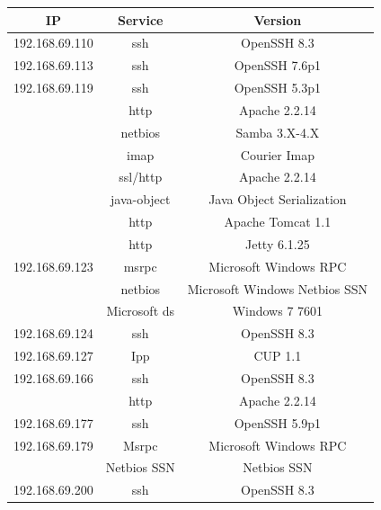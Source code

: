 \begin{table}[h!]
  \begin{center}
    \label{tab:table2}
    \begin{tabular}{c c c}
      \toprule
      \textbf{IP} & \textbf{Service} & \textbf{Version} \\
      \midrule
      192.168.69.110 & ssh & OpenSSH 8.3\\
      192.168.69.113 & ssh & OpenSSH 7.6p1\\
      192.168.69.119 & ssh & OpenSSH 5.3p1\\
      & http & Apache 2.2.14\\
      & netbios & Samba 3.X-4.X\\
      & imap & Courier Imap\\
      & ssl/http & Apache 2.2.14\\
      & java-object & Java Object Serialization\\
      & http & Apache Tomcat 1.1\\
      & http & Jetty 6.1.25\\
      192.168.69.123 & msrpc & Microsoft Windows RPC\\
      & netbios & Microsoft Windows Netbios SSN\\
      & Microsoft ds & Windows 7 7601\\
      192.168.69.124 & ssh & OpenSSH 8.3\\
      192.168.69.127 & Ipp & CUP 1.1\\
      192.168.69.166 & ssh & OpenSSH 8.3\\
      & http & Apache 2.2.14\\
      192.168.69.177 & ssh & OpenSSH 5.9p1\\
      192.168.69.179 & Msrpc & Microsoft Windows RPC\\
      & Netbios SSN & Netbios SSN\\
      192.168.69.200 & ssh & OpenSSH 8.3\\
      \bottomrule
    \end{tabular}
  \end{center}
\end{table}

